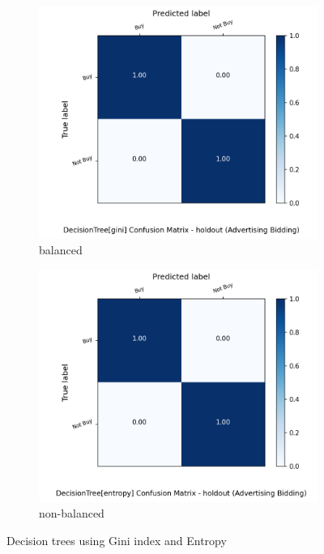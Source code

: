 \documentclass{article}
\begin{document}
\begin{figure}[H]
	\centering
	\begin{subfigure}{.5\textwidth}
		\centering
		\includegraphics[width=1.1\textwidth]{Plots/advertisingBidding_DecisionTree_gini_balance_True_holdout.png}
		\caption{balanced}
	\end{subfigure}%
	\begin{subfigure}{.5\textwidth}
		\centering
		\includegraphics[width=1.1\textwidth]{Plots/advertisingBidding_DecisionTree_entropy_balance_True_holdout.png}
		\caption{non-balanced}
	\end{subfigure}
	\caption{Decision trees using Gini index and Entropy}
\end{figure}
\end{document}
